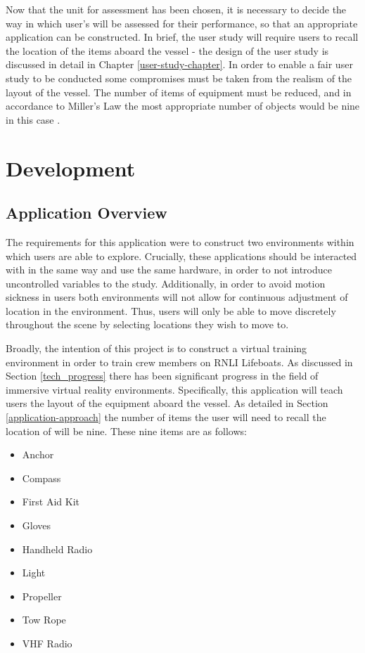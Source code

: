 \documentclass[ %
                    author={Elis Jones},
                supervisor={Dr. Kirsten Cater},
                    degree={BSc},
                     title={The Effect of Presentation Medium on Spatial Cognition},
                  subtitle={in the Virtual Environment},
                      year={2018} ]{dissertation}
\begin{document}
Now that the unit for assessment has been chosen, it is necessary to decide the way in which user's will be assessed for their performance, so that an appropriate application can be constructed. In brief, the user study will require users to recall the location of the items aboard the vessel - the design of the user study is discussed in detail in Chapter \ref{user-study-chapter}. In order to enable a fair user study to be conducted some compromises must be taken from the realism of the layout of the vessel. The number of items of equipment must be reduced, and in accordance to Miller's Law the most appropriate number of objects would be nine in this case \citep{Miller1956}. 

\chapter{Development}

\section{Application Overview}
The requirements for this application were to construct two environments within which users are able to explore. Crucially, these applications should be interacted with in the same way and use the same hardware, in order to not introduce uncontrolled variables to the study. Additionally, in order to avoid motion sickness in users both environments will not allow for continuous adjustment of location in the environment. Thus, users will only be able to move discretely throughout the scene by selecting locations they wish to move to. 

Broadly, the intention of this project is to construct a virtual training environment in order to train crew members on RNLI Lifeboats. As discussed in Section \ref{tech_progress} there has been significant progress in the field of immersive virtual reality environments. Specifically, this application will teach users the layout of the equipment aboard the vessel. As detailed in Section \ref{application-approach} the number of items the user will need to recall the location of will be nine. These nine items are as follows:

\begin{itemize}
    \item Anchor
    \item Compass
    \item First Aid Kit
    \item Gloves
    \item Handheld Radio
    \item Light
    \item Propeller
    \item Tow Rope
    \item VHF Radio
\end{itemize}
\end{document}
